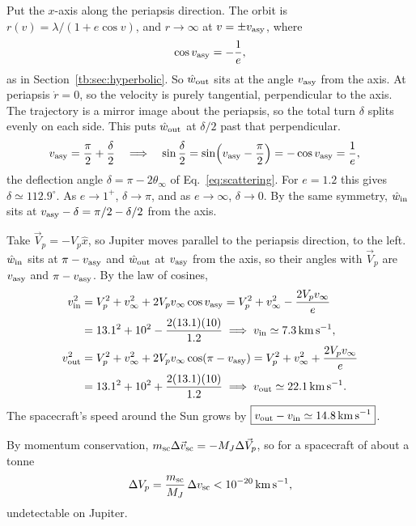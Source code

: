 Put the $x$-axis along the periapsis direction. The orbit is $r(v)=\lambda/(1+e\cos v)$, and $r\to\infty$ at $v=\pm v_{\rm asy}$, where
\begin{equation}
	\cos v_{\rm asy}=-\frac1e,
\end{equation}
as in Section~\ref{tb:sec:hyperbolic}. So $\hat w_{\rm out}$ sits at the angle $v_{\rm asy}$ from the axis. At periapsis $\dot r=0$, so the velocity is purely tangential, perpendicular to the axis. The trajectory is a mirror image about the periapsis, so the total turn $\delta$ splits evenly on each side. This puts $\hat w_{\rm out}$ at $\delta/2$ past that perpendicular.
\begin{align}
	v_{\rm asy} &= \frac\pi2+\frac\delta2
	\quad\Longrightarrow\quad
	\sin\frac\delta2 = \sin\!\left(v_{\rm asy}-\frac\pi2\right) = -\cos v_{\rm asy} = \frac1e,
	\label{eq:slingshot_deflection}
\end{align}
the deflection angle $\delta=\pi-2\theta_\infty$ of Eq.~\eqref{eq:scattering}. For $e=1.2$ this gives $\delta\simeq112.9^\circ$. As $e\to1^+$, $\delta\to\pi$, and as $e\to\infty$, $\delta\to0$. By the same symmetry, $\hat w_{\rm in}$ sits at $v_{\rm asy}-\delta=\pi/2-\delta/2$ from the axis.

Take $\vec V_p=-V_p\hat x$, so Jupiter moves parallel to the periapsis direction, to the left. $\hat w_{\rm in}$ sits at $\pi-v_{\rm asy}$ and $\hat w_{\rm out}$ at $v_{\rm asy}$ from the axis, so their angles with $\vec V_p$ are $v_{\rm asy}$ and $\pi-v_{\rm asy}$. By the law of cosines,
\begin{align}
	v_{\rm in}^2 &= V_p^2+v_\infty^2+2V_pv_\infty\cos v_{\rm asy} = V_p^2+v_\infty^2-\frac{2V_pv_\infty}{e}\\
	&= 13.1^2+10^2-\frac{2(13.1)(10)}{1.2}
	\;\Longrightarrow\; v_{\rm in}\simeq7.3\,\mathrm{km\,s^{-1}},\\
	v_{\rm out}^2 &= V_p^2+v_\infty^2+2V_pv_\infty\cos(\pi-v_{\rm asy}) = V_p^2+v_\infty^2+\frac{2V_pv_\infty}{e}\\
	&= 13.1^2+10^2+\frac{2(13.1)(10)}{1.2}
	\;\Longrightarrow\; v_{\rm out}\simeq22.1\,\mathrm{km\,s^{-1}}.
\end{align}
The spacecraft's speed around the Sun grows by $\boxed{v_{\rm out}-v_{\rm in}\simeq14.8\,\mathrm{km\,s^{-1}}}$.

By momentum conservation, $m_{\rm sc}\Delta\vec v_{\rm sc}=-M_J\Delta\vec V_p$, so for a spacecraft of about a tonne
\begin{equation}
	\Delta V_p=\frac{m_{\rm sc}}{M_J}\,\Delta v_{\rm sc}<10^{-20}\,\mathrm{km\,s^{-1}},
\end{equation}
undetectable on Jupiter.

